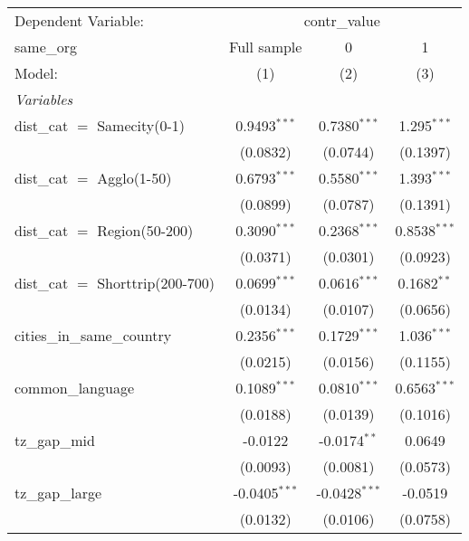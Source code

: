 
\begingroup
\centering
\begin{tabular}{lccc}
   \tabularnewline \midrule \midrule
   Dependent Variable: & \multicolumn{3}{c}{contr\_value}\\
   same\_org                         & Full sample     & 0               & 1 \\   
   Model:                            & (1)             & (2)             & (3)\\  
   \midrule
   \emph{Variables}\\
   dist\_cat $=$ Samecity(0-1)       & 0.9493$^{***}$  & 0.7380$^{***}$  & 1.295$^{***}$\\   
                                     & (0.0832)        & (0.0744)        & (0.1397)\\   
   dist\_cat $=$ Agglo(1-50)         & 0.6793$^{***}$  & 0.5580$^{***}$  & 1.393$^{***}$\\   
                                     & (0.0899)        & (0.0787)        & (0.1391)\\   
   dist\_cat $=$ Region(50-200)      & 0.3090$^{***}$  & 0.2368$^{***}$  & 0.8538$^{***}$\\   
                                     & (0.0371)        & (0.0301)        & (0.0923)\\   
   dist\_cat $=$ Shorttrip(200-700)  & 0.0699$^{***}$  & 0.0616$^{***}$  & 0.1682$^{**}$\\   
                                     & (0.0134)        & (0.0107)        & (0.0656)\\   
   cities\_in\_same\_country         & 0.2356$^{***}$  & 0.1729$^{***}$  & 1.036$^{***}$\\   
                                     & (0.0215)        & (0.0156)        & (0.1155)\\   
   common\_language                  & 0.1089$^{***}$  & 0.0810$^{***}$  & 0.6563$^{***}$\\   
                                     & (0.0188)        & (0.0139)        & (0.1016)\\   
   tz\_gap\_mid                      & -0.0122         & -0.0174$^{**}$  & 0.0649\\   
                                     & (0.0093)        & (0.0081)        & (0.0573)\\   
   tz\_gap\_large                    & -0.0405$^{***}$ & -0.0428$^{***}$ & -0.0519\\   
                                     & (0.0132)        & (0.0106)        & (0.0758)\\   

\end{tabular}
